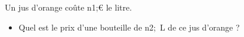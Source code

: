 \documentclass[exercice]{thedocument}%
\begin{document}
%
Un jus d'orange coûte \<n1;{\euro} le litre.
\begin{itemize}
    \item Quel est le prix d'une bouteille de \<n2;~L de ce jus d'orange ?
\end{itemize}
\end{document}
